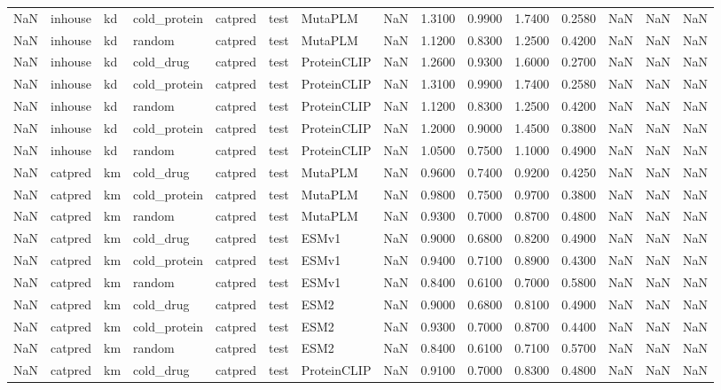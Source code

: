 \begin{tabular}{rlllllllrrrrrrr}
NaN & inhouse & kd & cold_protein & catpred & test & MutaPLM & NaN & 1.3100 & 0.9900 & 1.7400 & 0.2580 & NaN & NaN & NaN \\
NaN & inhouse & kd & random & catpred & test & MutaPLM & NaN & 1.1200 & 0.8300 & 1.2500 & 0.4200 & NaN & NaN & NaN \\
NaN & inhouse & kd & cold_drug & catpred & test & ProteinCLIP & NaN & 1.2600 & 0.9300 & 1.6000 & 0.2700 & NaN & NaN & NaN \\
NaN & inhouse & kd & cold_protein & catpred & test & ProteinCLIP & NaN & 1.3100 & 0.9900 & 1.7400 & 0.2580 & NaN & NaN & NaN \\
NaN & inhouse & kd & random & catpred & test & ProteinCLIP & NaN & 1.1200 & 0.8300 & 1.2500 & 0.4200 & NaN & NaN & NaN \\
NaN & inhouse & kd & cold_protein & catpred & test & ProteinCLIP & NaN & 1.2000 & 0.9000 & 1.4500 & 0.3800 & NaN & NaN & NaN \\
NaN & inhouse & kd & random & catpred & test & ProteinCLIP & NaN & 1.0500 & 0.7500 & 1.1000 & 0.4900 & NaN & NaN & NaN \\
NaN & catpred & km & cold_drug & catpred & test & MutaPLM & NaN & 0.9600 & 0.7400 & 0.9200 & 0.4250 & NaN & NaN & NaN \\
NaN & catpred & km & cold_protein & catpred & test & MutaPLM & NaN & 0.9800 & 0.7500 & 0.9700 & 0.3800 & NaN & NaN & NaN \\
NaN & catpred & km & random & catpred & test & MutaPLM & NaN & 0.9300 & 0.7000 & 0.8700 & 0.4800 & NaN & NaN & NaN \\
NaN & catpred & km & cold_drug & catpred & test & ESMv1 & NaN & 0.9000 & 0.6800 & 0.8200 & 0.4900 & NaN & NaN & NaN \\
NaN & catpred & km & cold_protein & catpred & test & ESMv1 & NaN & 0.9400 & 0.7100 & 0.8900 & 0.4300 & NaN & NaN & NaN \\
NaN & catpred & km & random & catpred & test & ESMv1 & NaN & 0.8400 & 0.6100 & 0.7000 & 0.5800 & NaN & NaN & NaN \\
NaN & catpred & km & cold_drug & catpred & test & ESM2 & NaN & 0.9000 & 0.6800 & 0.8100 & 0.4900 & NaN & NaN & NaN \\
NaN & catpred & km & cold_protein & catpred & test & ESM2 & NaN & 0.9300 & 0.7000 & 0.8700 & 0.4400 & NaN & NaN & NaN \\
NaN & catpred & km & random & catpred & test & ESM2 & NaN & 0.8400 & 0.6100 & 0.7100 & 0.5700 & NaN & NaN & NaN \\
NaN & catpred & km & cold_drug & catpred & test & ProteinCLIP & NaN & 0.9100 & 0.7000 & 0.8300 & 0.4800 & NaN & NaN & NaN \\

\end{tabular}
